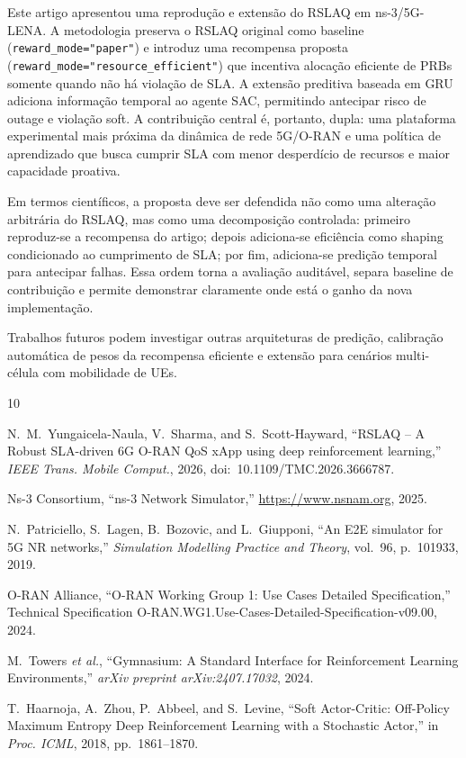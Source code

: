 \documentclass[10pt,a4paper]{IEEEtran}
\begin{document}
Este artigo apresentou uma reprodu\c{c}\~{a}o e extens\~{a}o do
RSLAQ em ns-3/5G-LENA. A metodologia preserva o RSLAQ
original como baseline (\texttt{reward\_mode="paper"}) e
introduz uma recompensa proposta
(\texttt{reward\_mode="resource\_efficient"}) que incentiva
aloca\c{c}\~{a}o eficiente de PRBs somente quando n\~{a}o
h\'{a} viola\c{c}\~{a}o de SLA. A extens\~{a}o preditiva
baseada em GRU adiciona informa\c{c}\~{a}o temporal ao
agente SAC, permitindo antecipar risco de outage e
viola\c{c}\~{a}o soft. A contribui\c{c}\~{a}o central
\'{e}, portanto, dupla: uma plataforma experimental mais
pr\'{o}xima da din\^{a}mica de rede 5G/O-RAN e uma pol\'{i}tica
de aprendizado que busca cumprir SLA com menor desperd\'{i}cio
de recursos e maior capacidade proativa.

Em termos cient\'{i}ficos, a proposta deve ser defendida
n\~{a}o como uma altera\c{c}\~{a}o arbitr\'{a}ria do RSLAQ,
mas como uma decomposi\c{c}\~{a}o controlada: primeiro
reproduz-se a recompensa do artigo; depois adiciona-se
efici\^{e}ncia como shaping condicionado ao cumprimento de
SLA; por fim, adiciona-se predi\c{c}\~{a}o temporal para
antecipar falhas. Essa ordem torna a avalia\c{c}\~{a}o
audit\'{a}vel, separa baseline de contribui\c{c}\~{a}o e
permite demonstrar claramente onde est\'{a} o ganho da nova
implementa\c{c}\~{a}o.

Trabalhos futuros podem investigar outras arquiteturas de
predi\c{c}\~{a}o, calibra\c{c}\~{a}o autom\'{a}tica de pesos
da recompensa eficiente e extens\~{a}o para cen\'{a}rios
multi-c\'{e}lula com mobilidade de UEs.


\begin{thebibliography}{10}

N.~M.~Yungaicela-Naula, V.~Sharma, and S.~Scott-Hayward,
``RSLAQ -- A Robust SLA-driven 6G O-RAN QoS xApp using deep
reinforcement learning,''
\emph{IEEE Trans. Mobile Comput.}, 2026,
doi:~10.1109/TMC.2026.3666787.

Ns-3 Consortium,
``ns-3 Network Simulator,''
\url{https://www.nsnam.org}, 2025.

N.~Patriciello, S.~Lagen, B.~Bozovic, and L.~Giupponi,
``An E2E simulator for 5G NR networks,''
\emph{Simulation Modelling Practice and Theory},
vol.~96, p.~101933, 2019.

O-RAN Alliance,
``O-RAN Working Group 1: Use Cases Detailed Specification,''
Technical Specification O-RAN.WG1.Use-Cases-Detailed-Specification-v09.00, 2024.

M.~Towers \emph{et al.},
``Gymnasium: A Standard Interface for Reinforcement Learning
Environments,''
\emph{arXiv preprint arXiv:2407.17032}, 2024.

T.~Haarnoja, A.~Zhou, P.~Abbeel, and S.~Levine,
``Soft Actor-Critic: Off-Policy Maximum Entropy Deep
Reinforcement Learning with a Stochastic Actor,''
in \emph{Proc. ICML}, 2018, pp.~1861--1870.

\end{thebibliography}
\end{document}
